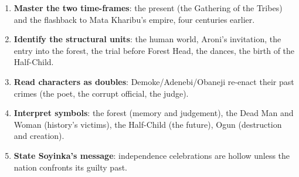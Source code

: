 \documentclass[11pt]{article}
\begin{document}
\begin{methode}
\begin{enumerate}
\item \textbf{Master the two time-frames}: the present (the Gathering of the Tribes) and the flashback to Mata Kharibu's empire, four centuries earlier.
\item \textbf{Identify the structural units}: the human world, Aroni's invitation, the entry into the forest, the trial before Forest Head, the dances, the birth of the Half-Child.
\item \textbf{Read characters as doubles}: Demoke/Adenebi/Obaneji re-enact their past crimes (the poet, the corrupt official, the judge).
\item \textbf{Interpret symbols}: the forest (memory and judgement), the Dead Man and Woman (history's victims), the Half-Child (the future), Ogun (destruction and creation).
\item \textbf{State Soyinka's message}: independence celebrations are hollow unless the nation confronts its guilty past.
\end{enumerate}
\end{methode}
\end{document}
